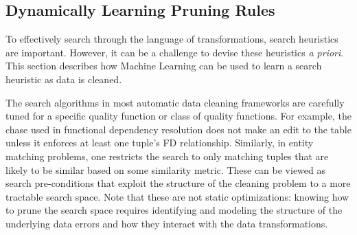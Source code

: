 
% 
% 







\subsection{Dynamically Learning Pruning Rules}\label{s:dynlearn}
To effectively search through the language of transformations, search heuristics are important.
However, it can be a challenge to devise these heuristics \emph{a priori}.
This section describes how Machine Learning can be used to learn a search heuristic as data is cleaned.

The search algorithms in  most automatic data cleaning frameworks are carefully tuned for a specific quality function or class of quality functions. For example, the chase used in functional dependency resolution does not make an edit to the table unless it enforces at least one tuple's FD relationship.    Similarly, in entity matching problems, one restricts the search to only matching tuples that are likely to be similar based on some similarity metric.
These can be viewed as search pre-conditions that exploit the structure of the cleaning problem to a more tractable search space.
Note that these are not static optimizations: knowing how to prune the search space requires identifying and modeling the structure of the underlying data errors and how they interact with the data transformations.

